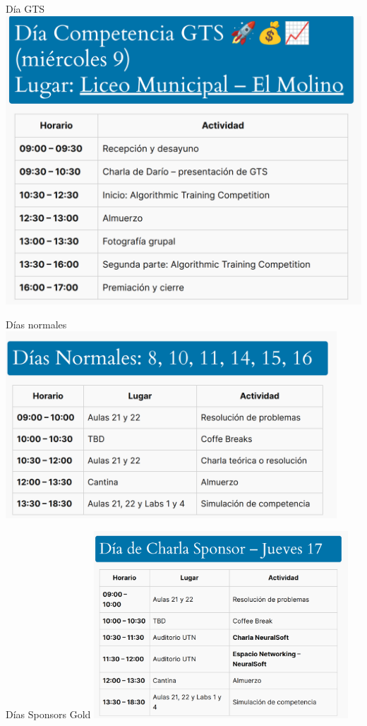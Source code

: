 \documentclass{beamer}
\begin{document}
\begin{frame}{Día GTS}
    \centering
    \includegraphics[width=\textwidth,height=\textheight,keepaspectratio]{img/crono_02.png}
\end{frame}

\begin{frame}{Días normales}
    \centering
    \includegraphics[clip,height=7cm,keepaspectratio]{img/crono_03.png}
\end{frame}

\begin{frame}{Días Sponsors Gold}
    \centering
    \includegraphics[clip,height=7cm,keepaspectratio]{img/crono_04.png}
\end{frame}
\end{document}
